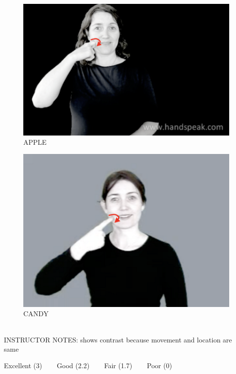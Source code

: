 \documentclass[12pt]{article}
\begin{document}
\begin{figure}[H]
\includegraphics{../images/asl_apple.png}
\caption{APPLE}
\end{figure}
\begin{figure}[H]
\includegraphics{../images/asl_candy.png}
\caption{CANDY}
\end{figure}

~\\
INSTRUCTOR NOTES: shows contrast because movement and location are same


\vfill
Excellent (3) ~~~ Good (2.2) ~~~ Fair (1.7) ~~~ Poor (0)
\newpage

\begin{center}
\textbf{{\color{red}{\HUGE END OF EXAM}}}\\

\end{center}
\newpage
\end{document}
